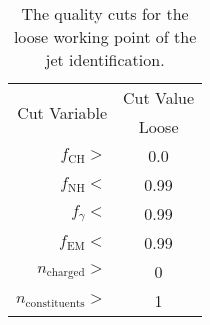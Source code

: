 \begin{table}[htb]
  \begin{center}
    \begin{tabular}{|r|c|}
      \hline
      \multirow{2}{*}{Cut Variable} & Cut Value \\
      \cline{2-2}
                                    & Loose \\
      \hline
      $f_{\text{CH}}>$              & 0.0 \\
      $f_{\text{NH}}<$              & 0.99 \\
      $f_{\gamma}<$                 & 0.99 \\
      $f_{\text{EM}}<$              & 0.99 \\
      $n_{\text{charged}}>$         & 0 \\
      $n_{\text{constituents}}>$    & 1 \\
      \hline
    \end{tabular}
    \caption{The quality cuts for the loose working point of the jet identification. }
    \label{tab:jetWP}
  \end{center}
\end{table}